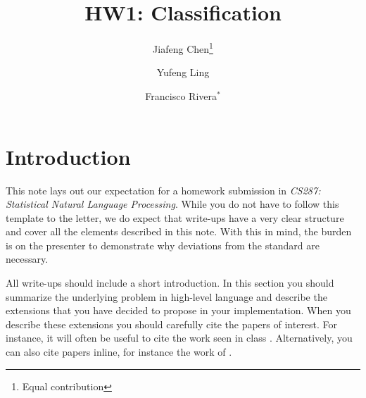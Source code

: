 \documentclass[11pt]{article}
\title{HW1: Classification}
\author{Jiafeng Chen\footnote{Equal contribution} \and Yufeng Ling \and
Francisco Rivera$^{*}$}
\begin{document}
\maketitle{}
\section{Introduction}

This note lays out our expectation for a homework submission in
\textit{CS287: Statistical Natural Language Processing}. While you do
not have to follow this template to the letter, we do expect that
write-ups have a very clear structure and cover all the elements
described in this note. With this in mind, the burden is on the
presenter to demonstrate why deviations from the standard are
necessary.

All write-ups should include a short introduction. In this section you
should summarize the underlying problem in high-level language and
describe the extensions that you have decided to propose in your
implementation. When you describe these extensions you should
carefully cite the papers of interest. For instance, it will often be
useful to cite the work seen in class
\citep{murphy2012machine}. Alternatively, you can also cite papers
inline, for instance the work of \citet{berger1996maximum}.


% 
% 
% 
% 
\end{document}
